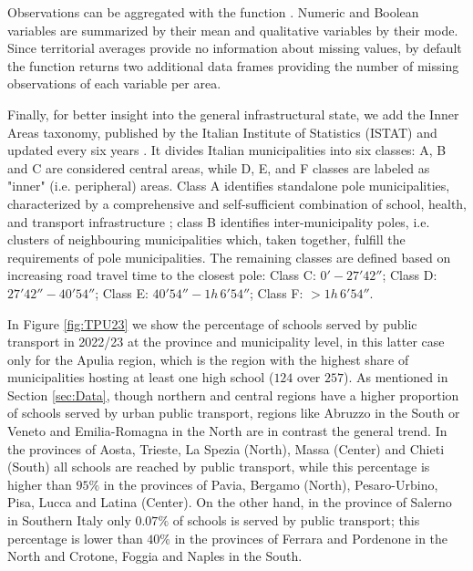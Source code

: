 \documentclass{article}%
\begin{document}
Observations can be aggregated with the function \texttt{}. Numeric and Boolean variables are summarized by their mean and qualitative variables by their mode. Since territorial averages provide no information about missing values, by default the function returns two additional data frames providing the number of missing observations of each variable per area.

Finally, for better insight into the general infrastructural state, we add the Inner Areas taxonomy, published by the Italian Institute of Statistics (ISTAT) and updated every six years \citep{InnerAreas}. It divides Italian municipalities into six classes: A, B and C are considered central areas, while D, E, and F classes are labeled as "inner" (i.e. peripheral) areas. Class A identifies standalone pole municipalities, characterized by a comprehensive and self-sufficient combination of school, health, and transport infrastructure \citep{InnerAreas}; class B identifies inter-municipality poles, i.e. clusters of neighbouring municipalities which, taken together, fulfill the requirements of pole municipalities. The remaining classes are defined based on increasing road travel time to the closest pole: Class C: $0' - 27'42''$; Class D: $27'42'' - 40'54''$; Class E: $40'54'' - 1h \, 6' 54''$; Class F: $> 1h \, 6' 54''$.

In Figure \ref{fig:TPU23} we show the percentage of schools served by public transport in 2022/23 at the province and municipality level, in this latter case only for the Apulia region, which is the region with the highest share of municipalities hosting at least one high school ($124$ over $257$). As mentioned in Section \ref{sec:Data}, though northern and central regions have a higher proportion of schools served by urban public transport, regions like Abruzzo in the South or Veneto and Emilia-Romagna in the North are in contrast the general trend. In the provinces of Aosta, Trieste, La Spezia (North), Massa (Center) and Chieti (South) all schools are reached by public transport, while this percentage is higher than $95\%$ in the provinces of Pavia, Bergamo (North), Pesaro-Urbino, Pisa, Lucca and Latina (Center). On the other hand, in the province of Salerno in Southern Italy only $0.07\%$ of schools is served by public transport; this percentage is lower than $40\%$ in the provinces of Ferrara and Pordenone in the North and Crotone, Foggia and Naples in the South.%
\end{document}
